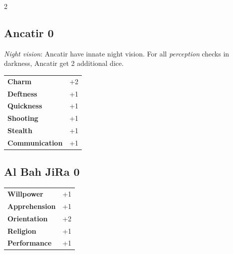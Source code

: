 \begin{multicols}{2}
\begin{tcolorbox}
\end{tcolorbox}

\begin{tcolorbox}
    \subsection*{Ancatir \hfill \small{0 }}
    \tcblower
\textit{Night vision}: Ancatir have innate night vision. For all \textit{perception} checks in darkness, Ancatir get 2 additional dice.


\vspace{3mm}

\begin{tabular}{@{}ll@{}}
    \textbf{Charm} & +2\\
    \textbf{Deftness} & +1\\
    \textbf{Quickness} & +1\\
    \textbf{Shooting} & +1\\
    \textbf{Stealth} & +1\\
    \textbf{Communication} & +1\\
\end{tabular}


\end{tcolorbox}

\begin{tcolorbox}
    \subsection*{Al Bah JiRa \hfill \small{0 }}
    \tcblower




\begin{tabular}{@{}ll@{}}
    \textbf{Willpower} & +1\\
    \textbf{Apprehension} & +1\\
    \textbf{Orientation} & +2\\
    \textbf{Religion} & +1\\
    \textbf{Performance} & +1\\
\end{tabular}



\end{tcolorbox}
\end{multicols}
